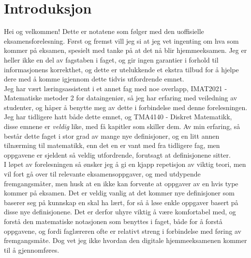 \section{Introduksjon}

Hei og velkommen! Dette er notatene som følger med den uoffisielle eksamensforelesning.
Først og fremst vill jeg si at jeg vet ingenting om hva som kommer på eksamen,
spesielt med tanke på at det nå blir hjemmeeksamen. Jeg er heller ikke en del av fagstaben
i faget, og gir ingen garantier i forhold til informasjonens korrekthet, og dette er utelukkende
et ekstra tilbud for å hjelpe dere med å komme igjennom dette tidvis utfordrende emnet.\\

\noindent Jeg har vært læringsassistent i et annet fag med noe overlapp, IMAT2021 - Matematiske metoder 2 for dataingeniør,
så jeg har erfaring med veiledning av studenter, og håper å benytte meg av dette i forbindelse med denne forelesningen.
Jeg har tidligere hatt både dette emnet, og TMA4140 - Diskret Matematikk, disse emnene er \textit{veldig} like, med 
få kapitler som skiller dem. Av min erfaring, så består dette faget i stor grad av mange nye definisjoner,
og en litt annen tilnærming til matematikk, enn det en er vant med fra tidligere fag, men oppgavene er sjeldent 
så veldig utfordrende, forutsagt at definisjonene sitter.\\

\noindent I løpet av forelesningen så ønsker jeg å gi en kjapp repetisjon av viktig teori,
men vil fort gå over til relevante eksamensoppgaver, og med utdypende fremgangsmåter, men husk at en ikke kan forvente
at oppgaver av en hvis type kommer på eksamen. Det er veldig vanlig at det kommer nye definisjoner som baserer seg på
kunnskap en skal ha lært, for så å løse enkle oppgaver basert på disse nye definisjonene. Det er derfor uhyre viktig
å være komfortabel med, og forstå den matematiske notasjonen som benyttes i faget, både for å forstå oppgavene, og
fordi faglæreren ofte er relativt streng i forbindelse med føring av fremgangsmåte. Dog vet jeg ikke hvordan den
digitale hjemmeeksamenen kommer til å gjennomføres. 

